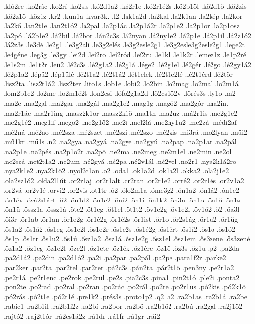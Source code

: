 {.kló2re
.ko2rác
.ko2rí
.ko2sis
.kó2d1a2
.kó2r1e
.kó2r1é2s
.kö2b1öl
.kö2d1ő
.kö2zis
.kö2z1ő
.köz1z
.kr2
.kun1a
.kvar3k.
.l2
.lak1a2d
.la2kal
.la2k1an
.la2kép
.la2kor
.la2kő
.lan2t1e
.lan2t1ó2
.la2pal
.la2p1ác
.la2p1á2r
.la2p1e2
.la2p1or
.la2p1osz
.la2pó
.lá2b1e2
.lá2bil
.lá2bor
.lán2c3s
.lá2nyan
.lá2ny1e2
.lá2p1e
.lá2p1il
.lá2z1ó2
.lá2z3s
.le3dé
.le2g1
.le3g2ali
.le3g2elés
.le3g2esle2g1
.le3g2esle3g2esle2g1
.lege2t
.le4géne
.leg3g
.le3gy
.lei2d
.leí2ro
.leí2ród
.leí2ru
.le1kl
.le1k2r
.lemez1z
.le1p2ré
.le1s2m
.le1t2r
.leü2
.lé2c3s
.lé2g1a2
.lé2g1á
.lége2
.lé2g1el
.lé2gér
.lé2go
.lé2gy1á2
.lé2p1a2
.lépü2
.lép1ülé
.lé2t1a2
.lé2t1á2
.lét1elek
.lé2t1e2lé
.lé2t1érd
.lé2tör
.lisz2ta
.lisz2t1á2
.lisz2ter
.lito1s
.lob1e
.lobi2
.lo2bin
.lo2mag
.lo2mal
.lo2m1á
.lom2b1e2
.lo2me
.lo2m1é2t
.lon2csi
.lófo2g1a2d
.lő2cs1ö2v
.lőrés3s
.ly1o
.m2
.ma2e
.ma2gal
.ma2gar
.ma2gál
.ma2g1e2
.mag1g
.magó2
.ma2gór
.ma2in.
.ma2r1ác
.ma2r1ing
.masz2k1or
.masz2k1ö
.ma1th
.ma2uz
.má2r1is
.me2g1e2
.me2g1é2
.meg1if
.mego2
.me2g1ő2
.me2i
.mel2lá
.me2ny1u2
.me2zá
.médi2af
.mé2ná
.mé2no
.mé2sza
.mé2szet
.mé2szi
.mé2szo
.mé2zis
.mi3rá
.mo2lyan
.műi2
.mű1kr
.mű1s
.n2
.na2gya
.na2gyá
.na2gye
.na2gyú
.na2pap
.na2p1ar
.na2pál
.na2p1e
.na2pés
.na2p1o2r
.na2pö
.ne2ma
.ne2meg
.ne2m1el
.ne2min
.ne2ol
.ne2szá
.net2t1a2
.ne2um
.né2gyá
.né2pa
.né2v1ál
.né2vel
.no2r1
.nya2k1á2ro
.nya2k1e2
.nya2k1ö2
.nyol2c1an
.o2
.oda1
.ok1a2d
.ok1a2l
.okka2
.ola2j1e2
.ola2sz1ó2
.olda2l1út
.or2r1aj
.or2r1alt
.or2ran
.or2r1e2
.orré2
.or2r1és
.or2v1a2
.or2vá
.or2v1é
.orvi2
.or2vis
.ot1tr
.ó2
.ólo2m1a
.óme3g2
.ón1a2
.ón1á2
.ón1e2
.ón1év
.óvá2s1árt
.ö2
.ön1d2
.ön1e2
.öni2
.ön1í
.ön1k2
.ön3n
.ön1o
.ön1ő
.ön1s
.ön1ü
.össz1a
.össz1á
.öte2
.öt1eg
.öt1el
.öt1t2
.öv1e2g
.öv1e2l
.öv1ő2
.ő2
.őa3l
.ői3r
.őr1ab
.őr1an
.őr1e2g
.őr1é2g
.őr1é2s
.őr1ist
.őr1o
.őr2s1ág
.őr1u2
.őr1üg
.ős1a2
.ős1á2
.ős1eg
.ős1e2l
.ős1e2r
.ős1e2s
.ős1é2g
.ős1ért
.ős1í2
.ős1o
.ős1ó2
.ős1p
.ős1tr
.ős1u2
.ős1ú
.ősz1a2
.ősz1á
.ősz1e2g
.ősz1el
.ősz1em
.ős3zene
.ős3zené
.őz1a2
.őz1eg
.őz1e2l
.őze2t
.őz1ete
.őz1ék
.őz1ére
.őz1ő
.őz3s
.őz1u
.p2
.pa2da
.pa2d1á2
.pa2din
.pa2d1ó2
.pa2i
.pa2par
.pa2pál
.pa2pe
.para1f2r
.parke2
.par2ker
.par2ta
.par2tel
.par2ter
.pá2c3s
.pán2ta
.pár2t1ö
.pen3ny
.pe2r1a2
.pe2r1á
.pe2r1enc
.pe2rok
.pe2rül
.pe2s
.pia2c3s
.pina1
.pin2t1ó
.ple2i
.ponta2
.pon2te
.po2rad
.po2ral
.po2ran
.po2rác
.po2rál
.po2re
.po2r1us
.pó2kis
.pó2k1ö
.pó2rás
.pó2t1e
.pó2t1é
.pre1k2
.prés3s
.proto1p2
.q2
.r2
.ra2b1as
.ra2b1á
.ra2be
.rabic1
.ra2b1il
.ra2b1i2z
.ra2bí
.ra2bor
.ra2bö
.ra2b1ő2
.ra2bú
.ra2gal
.ra2j1ö2
.rajtó2
.raj2t1ór
.rá2cs1á2z
.rá1dr
.rá1fr
.rá1gr
.rái2
}
